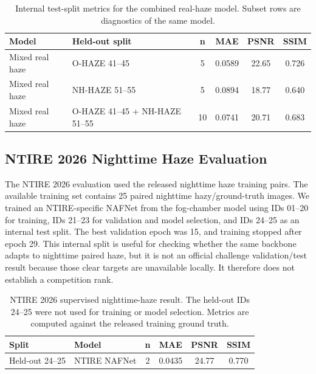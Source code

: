 \documentclass[9pt]{osa-supplemental-document}
\begin{document}
\begin{table}[H]
\centering
\small
\caption{Internal test-split metrics for the combined real-haze model. Subset rows are diagnostics of the same model.}
\label{tabS:external_heldout}
\begin{tabular}{@{}>{\raggedright\arraybackslash}p{}>{\raggedright\arraybackslash}p{}cccc@{}}
\toprule
\textbf{Model} & \textbf{Held-out split} & \textbf{n} & \textbf{MAE} & \textbf{PSNR} & \textbf{SSIM} \\
\midrule
Mixed real haze & O-HAZE 41--45 & 5 & 0.0589 & 22.65 & 0.726 \\
Mixed real haze & NH-HAZE 51--55 & 5 & 0.0894 & 18.77 & 0.640 \\
Mixed real haze & O-HAZE 41--45 + NH-HAZE 51--55 & 10 & 0.0741 & 20.71 & 0.683 \\
\bottomrule
\end{tabular}
\end{table}
\FloatBarrier

 

\subsection{NTIRE 2026 Nighttime Haze Evaluation}

The NTIRE 2026 evaluation used the released nighttime haze training pairs. The available training set contains 25 paired nighttime hazy/ground-truth images. We trained an NTIRE-specific NAFNet from the fog-chamber model using IDs 01--20 for training, IDs 21--23 for validation and model selection, and IDs 24--25 as an internal test split. The best validation epoch was 15, and training stopped after epoch 29. This internal split is useful for checking whether the same backbone adapts to nighttime paired haze, but it is not an official challenge validation/test result because those clear targets are unavailable locally. It therefore does not establish a competition rank.

\begin{table}[H]
\centering
\small
\caption{NTIRE 2026 supervised nighttime-haze result. The held-out IDs 24--25 were not used for training or model selection. Metrics are computed against the released training ground truth.}
\label{tabS:ntire26_supervised}
\begin{tabular}{llcccc}
\toprule
\textbf{Split} & \textbf{Model} & \textbf{n} & \textbf{MAE} & \textbf{PSNR} & \textbf{SSIM} \\
\midrule
Held-out 24--25 & NTIRE NAFNet & 2 & 0.0435 & 24.77 & 0.770 \\
\bottomrule
\end{tabular}
\end{table}
\FloatBarrier
\end{document}
